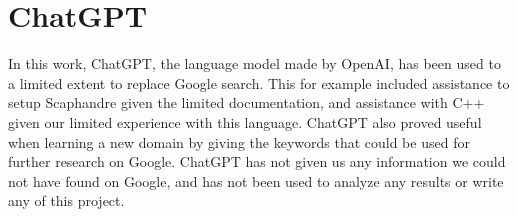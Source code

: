 \section{ChatGPT}\label{app:chat-gpt}

In this work, ChatGPT, the language model made by OpenAI, has been used to a limited extent to replace Google search. This for example included assistance to setup Scaphandre given the limited documentation, and assistance with C++ given our limited experience with this language. ChatGPT also proved useful when learning a new domain by giving the keywords that could be used for further research on Google. ChatGPT has not given us any information we could not have found on Google, and has not been used to analyze any results or write any of this project.